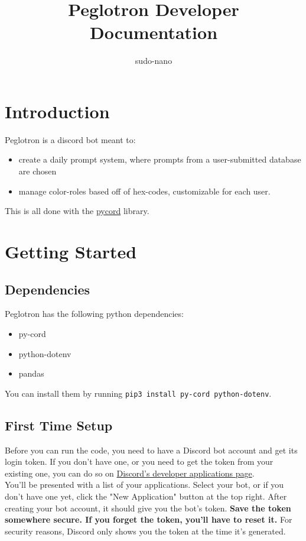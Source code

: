 \documentclass{article}
\title{Peglotron Developer Documentation}
\author{sudo-nano}
\begin{document}
\maketitle

\tableofcontents

\section{Introduction}
Peglotron is a discord bot meant to: 

\begin{itemize}
	\item create a daily prompt system, where prompts from a user-submitted database are chosen
	\item manage color-roles based off of hex-codes, customizable for each user. 
\end{itemize}

This is all done with the \href{https://guide.pycord.dev/}{pycord} library. 


\section{Getting Started}

\subsection{Dependencies}
Peglotron has the following python dependencies:
\begin{itemize}
	\item py-cord
	\item python-dotenv
	\item pandas
\end{itemize}

You can install them by running \verb|pip3 install py-cord python-dotenv|. 

\subsection{First Time Setup}
Before you can run the code, you need to have a Discord bot account and get its login token. If you don't have one, or you need to get the token from your existing one, you can do so on \href{https://discord.com/developers/applications/me}{Discord's developer applications page}. \\

You'll be presented with a list of your applications. Select your bot, or if you don't have one yet, click the "New Application" button at the top right. After creating your bot account, it should give you the bot's token. \textbf{Save the token somewhere secure. If you forget the token, you'll have to reset it.} For security reasons, Discord only shows you the token at the time it's generated. \\
\end{document}
